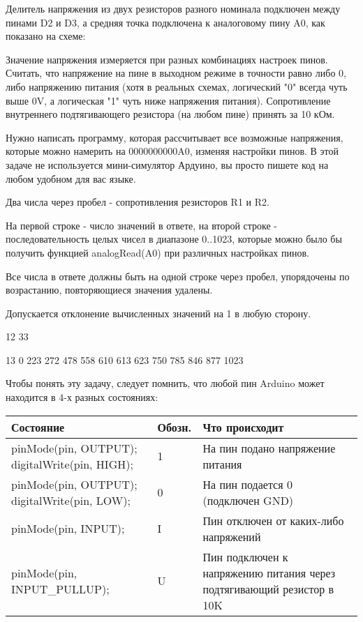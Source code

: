 
Делитель напряжения из двух резисторов разного номинала подключен между пинами D2 и D3, а средняя точка подключена к аналоговому пину A0, как показано на схеме:


Значение напряжения измеряется при разных комбинациях настроек пинов. Считать, что напряжение на пине в выходном режиме в точности равно либо 0, либо напряжению питания (хотя в реальных схемах, логический "0" всегда чуть выше 0V, а логическая "1" чуть ниже напряжения питания). Сопротивление внутреннего подтягивающего резистора (на любом пине) принять за 10 кОм.  

Нужно написать программу, которая рассчитывает все возможные напряжения, которые можно намерить на 0000000000A0, изменяя настройки пинов.  В этой задаче не используется мини-симулятор Ардуино, вы просто пишете код на любом удобном для вас языке.

Два числа через пробел - сопротивления резисторов R1 и R2.

\outputfmtSection
На первой строке - число значений в ответе, на второй строке - последовательность целых чисел в диапазоне 0..1023, 
которые можно было бы получить функцией analogRead(A0) при различных настройках пинов.  

Все числа в ответе должны быть  на одной строке через пробел,  упорядочены по возрастанию,  
повторяющиеся значения удалены. 

Допускается отклонение вычисленных значений на 1 в любую сторону.

\begin{myverbbox}[\small]{\vinput}
    12 33
\end{myverbbox}
\begin{myverbbox}[\small]{\voutput}
    13
    0 223 272 478 558 610 613 623 750 785 846 877 1023
\end{myverbbox}

\solutionSection

Чтобы понять эту задачу, следует помнить, что любой пин Arduino может находится в 4-х разных состояниях:

\begin{tabular}{|p{3.5cm}|p{1.5cm}|p{6cm}|}
    \hline
    Состояние&Обозн.&Что происходит \\
    \hline
    pinMode(pin, OUTPUT);
    digitalWrite(pin,  HIGH);& 1& На пин подано напряжение питания\\
    \hline
    pinMode(pin, OUTPUT);
    digitalWrite(pin,  LOW); & 0 & На пин подается 0 (подключен GND) \\
    \hline
    pinMode(pin, INPUT); &I &Пин отключен от каких-либо напряжений \\
    \hline
    pinMode(pin, INPUT\_PULLUP);& U & Пин подключен к напряжению питания через подтягивающий резистор в 10K \\
    \hline
\end{tabular}
 
